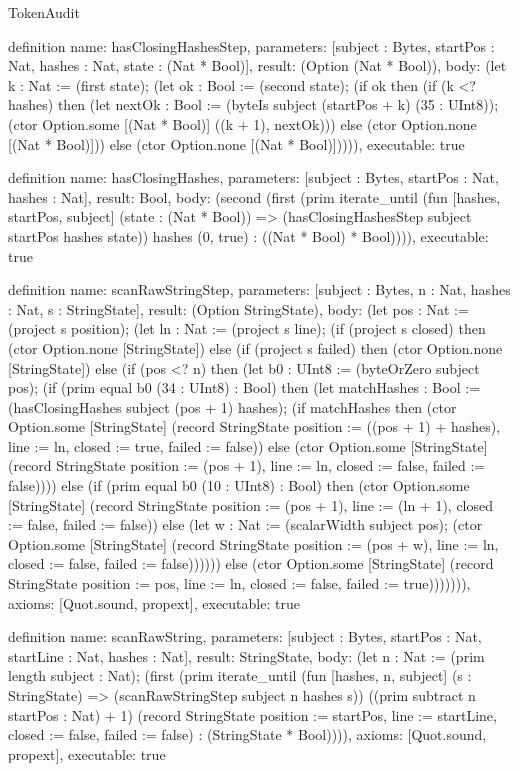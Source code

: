 \begin{lexlean}{TokenAudit}
\begin{semanticmodule}
definition{
  name: hasClosingHashesStep,
  parameters: [subject : Bytes, startPos : Nat, hashes : Nat, state : (Nat * Bool)],
  result: (Option (Nat * Bool)),
  body: (let k : Nat := (first state); (let ok : Bool := (second state); (if ok then (if (k <? hashes) then (let nextOk : Bool := (byteIs subject (startPos + k) (35 : UInt8)); (ctor Option.some [(Nat * Bool)] ((k + 1), nextOk))) else (ctor Option.none [(Nat * Bool)])) else (ctor Option.none [(Nat * Bool)])))),
  executable: true
}

definition{
  name: hasClosingHashes,
  parameters: [subject : Bytes, startPos : Nat, hashes : Nat],
  result: Bool,
  body: (second (first (prim iterate_until (fun [hashes, startPos, subject] (state : (Nat * Bool)) => (hasClosingHashesStep subject startPos hashes state)) hashes (0, true) : ((Nat * Bool) * Bool)))),
  executable: true
}

definition{
  name: scanRawStringStep,
  parameters: [subject : Bytes, n : Nat, hashes : Nat, s : StringState],
  result: (Option StringState),
  body: (let pos : Nat := (project s position); (let ln : Nat := (project s line); (if (project s closed) then (ctor Option.none [StringState]) else (if (project s failed) then (ctor Option.none [StringState]) else (if (pos <? n) then (let b0 : UInt8 := (byteOrZero subject pos); (if (prim equal b0 (34 : UInt8) : Bool) then (let matchHashes : Bool := (hasClosingHashes subject (pos + 1) hashes); (if matchHashes then (ctor Option.some [StringState] (record StringState {position := ((pos + 1) + hashes), line := ln, closed := true, failed := false})) else (ctor Option.some [StringState] (record StringState {position := (pos + 1), line := ln, closed := false, failed := false})))) else (if (prim equal b0 (10 : UInt8) : Bool) then (ctor Option.some [StringState] (record StringState {position := (pos + 1), line := (ln + 1), closed := false, failed := false})) else (let w : Nat := (scalarWidth subject pos); (ctor Option.some [StringState] (record StringState {position := (pos + w), line := ln, closed := false, failed := false})))))) else (ctor Option.some [StringState] (record StringState {position := pos, line := ln, closed := false, failed := true}))))))),
  axioms: [Quot.sound, propext],
  executable: true
}

definition{
  name: scanRawString,
  parameters: [subject : Bytes, startPos : Nat, startLine : Nat, hashes : Nat],
  result: StringState,
  body: (let n : Nat := (prim length subject : Nat); (first (prim iterate_until (fun [hashes, n, subject] (s : StringState) => (scanRawStringStep subject n hashes s)) ((prim subtract n startPos : Nat) + 1) (record StringState {position := startPos, line := startLine, closed := false, failed := false}) : (StringState * Bool)))),
  axioms: [Quot.sound, propext],
  executable: true
}


\end{semanticmodule}
\end{lexlean}
